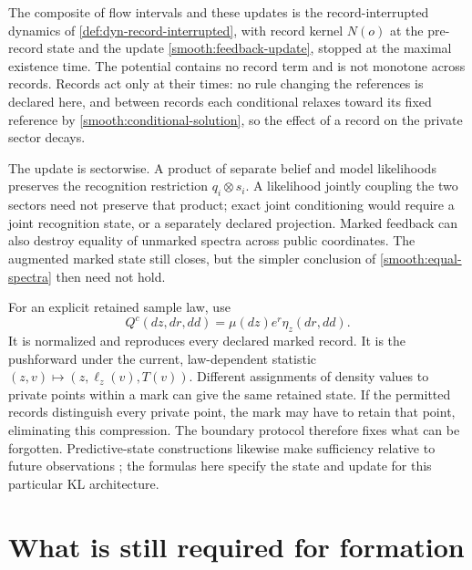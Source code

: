 The composite of flow intervals and these updates is the record-interrupted dynamics of \cref{def:dyn-record-interrupted}, with record kernel $N(o)$ at the pre-record state and the update \cref{smooth:feedback-update}, stopped at the maximal existence time. The potential contains no record term and is not monotone across records. Records act only at their times: no rule changing the references is declared here, and between records each conditional relaxes toward its fixed reference by \cref{smooth:conditional-solution}, so the effect of a record on the private sector decays.

The update is sectorwise. A product of separate belief and model likelihoods preserves the recognition restriction $q_i\otimes s_i$. A likelihood jointly coupling the two sectors need not preserve that product; exact joint conditioning would require a joint recognition state, or a separately declared projection. Marked feedback can also destroy equality of unmarked spectra across public coordinates. The augmented marked state still closes, but the simpler conclusion of \cref{smooth:equal-spectra} then need not hold.

For an explicit retained sample law, use
\begin{equation}
 Q^c(dz,dr,dd)=\mu(dz)e^r\eta_z(dr,dd).
 \label{smooth:marked-sample-law}
\end{equation}
It is normalized and reproduces every declared marked record. It is the pushforward under the current, law-dependent statistic $(z,v)\mapsto(z,\ell_z(v),T(v))$. Different assignments of density values to private points within a mark can give the same retained state. If the permitted records distinguish every private point, the mark may have to retain that point, eliminating this compression. The boundary protocol therefore fixes what can be forgotten. Predictive-state constructions likewise make sufficiency relative to future observations \citep{ShaliziCrutchfield2001}; the formulas here specify the state and update for this particular KL architecture.

\section{What is still required for formation}


